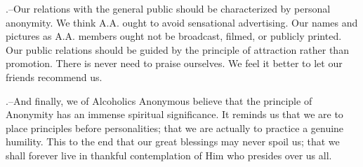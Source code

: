 \begin{biblechapter}
.--Our relations with the general public 
    should be characterized by personal anonymity.
    We think A.A. ought to avoid sensational advertising.
    Our names and pictures as A.A. members 
    ought not be broadcast, filmed, or publicly printed.
    Our public relations should be guided by the principle of attraction 
    rather than promotion.
    There is never need to praise ourselves.
    We feel it better to let our friends recommend us.

.--And finally, we of Alcoholics Anonymous 
    believe that the principle of Anonymity 
    has an immense spiritual significance.
    It reminds us that we are to place principles before personalities; 
    that we are actually to practice a genuine humility.
    This to the end that our great blessings may never spoil us; 
    that we shall forever live in thankful contemplation 
    of Him who presides over us all.
\end{biblechapter}
